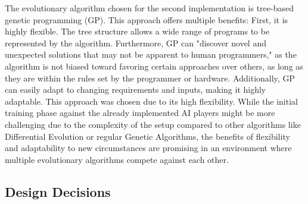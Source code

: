 \documentclass[sigconf]{acmart} %
\begin{document}
The evolutionary algorithm chosen for the second implementation is tree-based genetic programming (GP). This approach offers multiple benefits: 
First, it is highly flexible. The tree structure allows a wide range of programs to be represented by the algorithm. 
Furthermore, GP can "discover novel and unexpected solutions that may not be apparent to human programmers," as the algorithm is not biased toward favoring certain approaches over others, as long as they are within the rules set by the programmer or hardware. 
Additionally, GP can easily adapt to changing requirements and inputs, making it highly adaptable. 
This approach was chosen due to its high flexibility. While the initial training phase against the already implemented AI players might be more challenging due to the complexity of the setup compared to other algorithms like Differential Evolution or regular Genetic Algorithms, the benefits of flexibility and adaptability to new circumstances are promising in an environment where multiple evolutionary algorithms compete against each other. 

\subsection{Design Decisions}
\end{document}
